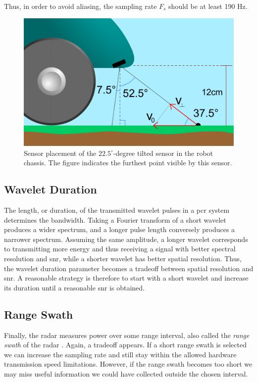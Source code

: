 Thus, in order to avoid aliasing, the sampling rate $F_s$ should be at least 190 Hz. 


\begin{figure}[h]
	\centering
	\includegraphics[scale=0.30]{figs_temp/sensor_placement.jpg}
	\caption{Sensor placement of the $22.5^\circ$-degree tilted sensor in the robot chassis. The figure indicates the furthest point visible by this sensor.}
	\label{fig:sensor_placement}
\end{figure}
\subsection{Wavelet Duration}

The length, or duration, of the transmitted wavelet pulses in a \gls{pcr} system determines the bandwidth. Taking a Fourier transform of a short wavelet produces a wider spectrum, and a longer pulse length conversely produces a narrower spectrum. Assuming the same amplitude, a longer wavelet corresponds to transmitting more energy and thus receiving a signal with better spectral resolution and \gls{snr}, while a shorter wavelet has better spatial resolution. Thus, the wavelet duration parameter becomes a tradeoff between spatial resolution and \gls{snr}. A reasonable strategy is therefore to start with a short wavelet and increase its duration until a reasonable \gls{snr} is obtained.  

\subsection{Range Swath}

Finally, the radar measures power over some range interval, also called the \emph{range swath} of the radar \citep{richards_2014}. Again, a tradeoff appears. If a short range swath is selected we can increase the sampling rate and still stay within the allowed hardware transmission speed limitations. However, if the range swath becomes too short we may miss useful information we could have collected outside the chosen interval. 

